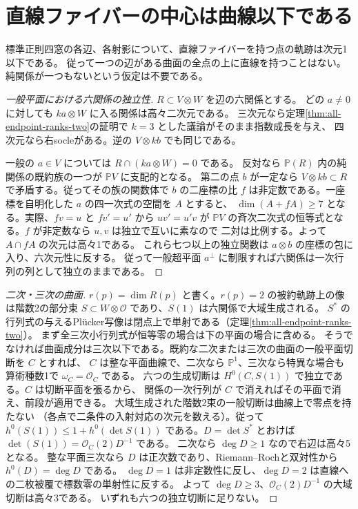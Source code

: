\section{直線ファイバーの中心は曲線以下である}
\label{sec:branching-curve-bound}
\begin{theorem}\label{thm:branching-centers-curve}
標準正則四窓の各辺、各射影について、直線ファイバーを持つ点の軌跡は次元1以下である。
従って一つの辺がある曲面の全点の上に直線を持つことはない。
純関係が一つもないという仮定は不要である。
\end{theorem}
\begin{proof}[一般平面における六関係の独立性]
$R\subset V\otimes W$ を辺の六関係とする。
どの $a\ne0$ に対しても $ka\otimes W$ に入る関係は高々二次元である。
三次元なら定理\ref{thm:all-endpoint-ranks-two}の証明で $k=3$ とした議論がそのまま指数成長を与え、
四次元なら右socleがある。逆の $V\otimes kb$ でも同じである。

一般の $a\in V$ については $R\cap(ka\otimes W)=0$ である。
反対なら $\mathbb P(R)$ 内の純関係の既約族の一つが $\mathbb P V$ に支配的となる。
第二の点 $b$ が一定なら $V\otimes kb\subset R$ で矛盾する。従ってその族の関数体で
$b$ の二座標の比 $f$ は非定数である。一座標を自明化した $a$ の四一次式の空間を $A$ とすると、
$\dim(A+fA)\ge7$ となる。実際、$f v=u$ と $f v'=u'$ から $u v'=u' v$ が
$\mathbb P V$ の斉次二次式の恒等式となる。$f$ が非定数なら $u,v$ は独立で互いに素なので
二対は比例する。よって $A\cap fA$ の次元は高々1である。
これら七つ以上の独立関数は $a\otimes b$ の座標の包に入り、六次元性に反する。
従って一般超平面 $a^\perp$ に制限すれば六関係は一次行列の列として独立のままである。

\end{proof}
\begin{proof}[二次・三次の曲面]
$r(p)=\dim R(p)$ と書く。$r(p)=2$ の被約軌跡上の像は階数2の部分束
$S\subset W\otimes\mathcal O$ であり、$S(1)$ は六関係で大域生成される。
$S^*$ の行列式の与えるPlücker写像は閉点上で単射である（定理\ref{thm:all-endpoint-ranks-two}）。
まず全三次小行列式が恒等零の場合は下の平面の場合に含める。
そうでなければ曲面成分は三次以下である。既約な二次または三次の曲面の一般平面切断を $C$ とすれば、
$C$ は整な平面曲線で、二次なら $\mathbb P^1$、三次なら特異な場合も算術種数1で $\omega_C=\mathcal O_C$ である。
六つの生成切断は $H^0(C,S(1))$ で独立である。$C$ は切断平面を張るから、
関係の一次行列が $C$ で消えればその平面で消え、前段が適用できる。
大域生成された階数2束の一般切断は曲線上で零点を持たない
（各点で二条件の入射対応の次元を数える）。従って
$h^0(S(1))\le1+h^0(\det S(1))$ である。$D=\det S^*$ とおけば
$\det(S(1))=\mathcal O_C(2)D^{-1}$ である。
二次なら $\deg D\ge1$ なので右辺は高々5となる。
整な平面三次なら $D$ は正次数であり、Riemann--Rochと双対性から $h^0(D)=\deg D$ である。
$\deg D=1$ は非定数性に反し、$\deg D=2$ は直線への二枚被覆で標数零の単射性に反する。
よって $\deg D\ge3$、$\mathcal O_C(2)D^{-1}$ の大域切断は高々3である。
いずれも六つの独立切断に足りない。
\end{proof}

